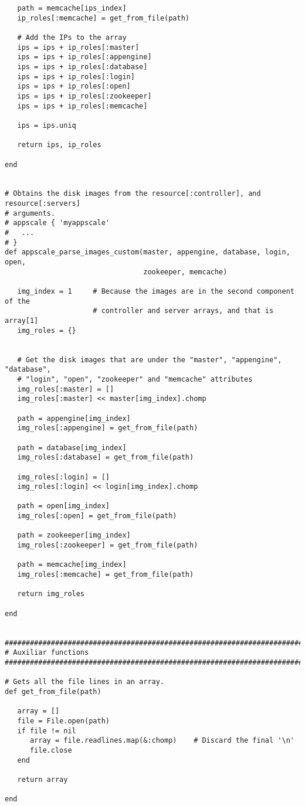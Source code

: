 \begin{lstlisting}
   path = memcache[ips_index]
   ip_roles[:memcache] = get_from_file(path)

   # Add the IPs to the array   
   ips = ips + ip_roles[:master]
   ips = ips + ip_roles[:appengine]
   ips = ips + ip_roles[:database]
   ips = ips + ip_roles[:login]
   ips = ips + ip_roles[:open]
   ips = ips + ip_roles[:zookeeper]
   ips = ips + ip_roles[:memcache]
   
   ips = ips.uniq
   
   return ips, ip_roles
   
end


# Obtains the disk images from the resource[:controller], and resource[:servers]
# arguments.
# appscale { 'myappscale'
#   ...
# }
def appscale_parse_images_custom(master, appengine, database, login, open,
                                 zookeeper, memcache)

   img_index = 1     # Because the images are in the second component of the
                     # controller and server arrays, and that is array[1]
   img_roles = {}

   
   # Get the disk images that are under the "master", "appengine", "database",
   # "login", "open", "zookeeper" and "memcache" attributes
   img_roles[:master] = []
   img_roles[:master] << master[img_index].chomp
   
   path = appengine[img_index]
   img_roles[:appengine] = get_from_file(path)
   
   path = database[img_index]
   img_roles[:database] = get_from_file(path)
   
   img_roles[:login] = []
   img_roles[:login] << login[img_index].chomp
   
   path = open[img_index]
   img_roles[:open] = get_from_file(path)
   
   path = zookeeper[img_index]
   img_roles[:zookeeper] = get_from_file(path)

   path = memcache[img_index]
   img_roles[:memcache] = get_from_file(path)

   return img_roles
   
end


################################################################################
# Auxiliar functions
################################################################################

# Gets all the file lines in an array.
def get_from_file(path)

   array = []
   file = File.open(path)
   if file != nil
      array = file.readlines.map(&:chomp)    # Discard the final '\n'
      file.close
   end

   return array

end
\end{lstlisting}


